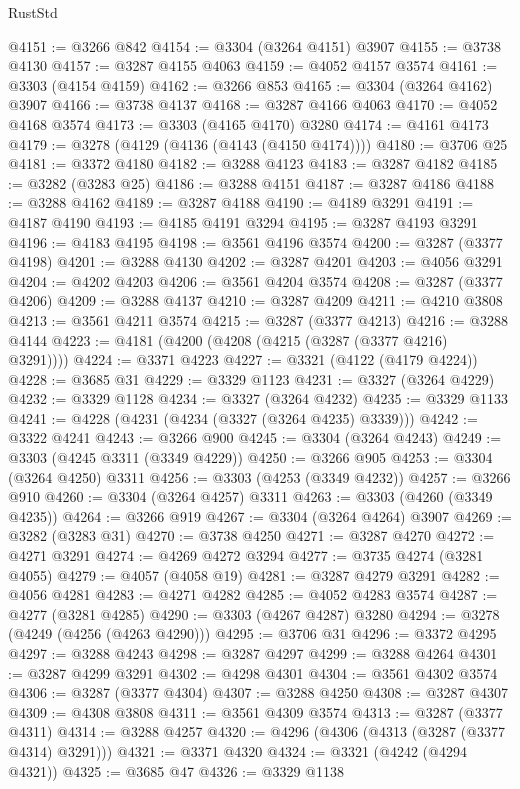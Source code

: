 \begin{lexlean}{RustStd}
\begin{coremodule}
{\begin{coremodule}
{{{{{{{{{{{{{{{{{{{{{{{{{{{{{{{{{@4151 := @3266 @842
@4154 := @3304 (@3264 @4151) @3907
@4155 := @3738 @4130
@4157 := @3287 @4155 @4063
@4159 := @4052 @4157 @3574
@4161 := @3303 (@4154 @4159)
@4162 := @3266 @853
@4165 := @3304 (@3264 @4162) @3907
@4166 := @3738 @4137
@4168 := @3287 @4166 @4063
@4170 := @4052 @4168 @3574
@4173 := @3303 (@4165 @4170) @3280
@4174 := @4161 @4173
@4179 := @3278 (@4129 (@4136 (@4143 (@4150 @4174))))
@4180 := @3706 @25
@4181 := @3372 @4180
@4182 := @3288 @4123
@4183 := @3287 @4182
@4185 := @3282 (@3283 @25)
@4186 := @3288 @4151
@4187 := @3287 @4186
@4188 := @3288 @4162
@4189 := @3287 @4188
@4190 := @4189 @3291
@4191 := @4187 @4190
@4193 := @4185 @4191 @3294
@4195 := @3287 @4193 @3291
@4196 := @4183 @4195
@4198 := @3561 @4196 @3574
@4200 := @3287 (@3377 @4198)
@4201 := @3288 @4130
@4202 := @3287 @4201
@4203 := @4056 @3291
@4204 := @4202 @4203
@4206 := @3561 @4204 @3574
@4208 := @3287 (@3377 @4206)
@4209 := @3288 @4137
@4210 := @3287 @4209
@4211 := @4210 @3808
@4213 := @3561 @4211 @3574
@4215 := @3287 (@3377 @4213)
@4216 := @3288 @4144
@4223 := @4181 (@4200 (@4208 (@4215 (@3287 (@3377 @4216) @3291))))
@4224 := @3371 @4223
@4227 := @3321 (@4122 (@4179 @4224))
@4228 := @3685 @31
@4229 := @3329 @1123
@4231 := @3327 (@3264 @4229)
@4232 := @3329 @1128
@4234 := @3327 (@3264 @4232)
@4235 := @3329 @1133
@4241 := @4228 (@4231 (@4234 (@3327 (@3264 @4235) @3339)))
@4242 := @3322 @4241
@4243 := @3266 @900
@4245 := @3304 (@3264 @4243)
@4249 := @3303 (@4245 @3311 (@3349 @4229))
@4250 := @3266 @905
@4253 := @3304 (@3264 @4250) @3311
@4256 := @3303 (@4253 (@3349 @4232))
@4257 := @3266 @910
@4260 := @3304 (@3264 @4257) @3311
@4263 := @3303 (@4260 (@3349 @4235))
@4264 := @3266 @919
@4267 := @3304 (@3264 @4264) @3907
@4269 := @3282 (@3283 @31)
@4270 := @3738 @4250
@4271 := @3287 @4270
@4272 := @4271 @3291
@4274 := @4269 @4272 @3294
@4277 := @3735 @4274 (@3281 @4055)
@4279 := @4057 (@4058 @19)
@4281 := @3287 @4279 @3291
@4282 := @4056 @4281
@4283 := @4271 @4282
@4285 := @4052 @4283 @3574
@4287 := @4277 (@3281 @4285)
@4290 := @3303 (@4267 @4287) @3280
@4294 := @3278 (@4249 (@4256 (@4263 @4290)))
@4295 := @3706 @31
@4296 := @3372 @4295
@4297 := @3288 @4243
@4298 := @3287 @4297
@4299 := @3288 @4264
@4301 := @3287 @4299 @3291
@4302 := @4298 @4301
@4304 := @3561 @4302 @3574
@4306 := @3287 (@3377 @4304)
@4307 := @3288 @4250
@4308 := @3287 @4307
@4309 := @4308 @3808
@4311 := @3561 @4309 @3574
@4313 := @3287 (@3377 @4311)
@4314 := @3288 @4257
@4320 := @4296 (@4306 (@4313 (@3287 (@3377 @4314) @3291)))
@4321 := @3371 @4320
@4324 := @3321 (@4242 (@4294 @4321))
@4325 := @3685 @47
@4326 := @3329 @1138
}}}}}}}}}}}}}}}}}}}}}}}}}}}}}}}}}
\end{coremodule}}
\end{coremodule}
\end{lexlean}
